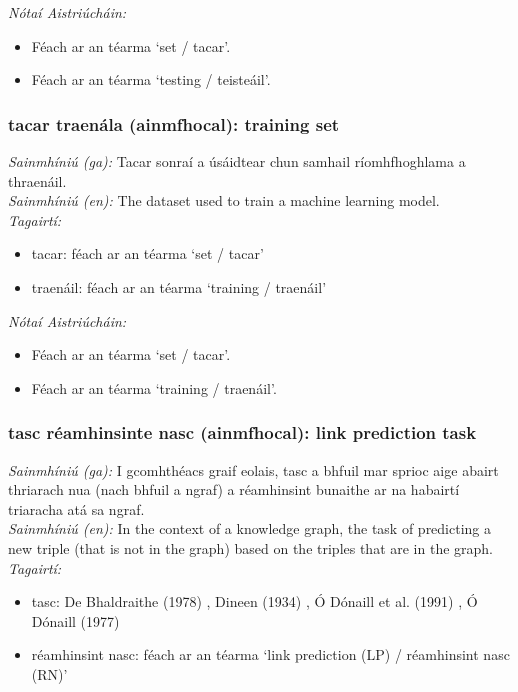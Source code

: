 \documentclass{article}
\begin{document}
 \noindent \textit{Nótaí Aistriúcháin:}
\begin{itemize}
	\item Féach ar an téarma `set / tacar'.
	\item Féach ar an téarma `testing / teisteáil'.
\end{itemize}


\subsubsection*{tacar traenála (ainmfhocal): training set}
 \noindent \textit{Sainmhíniú (ga):} Tacar sonraí a úsáidtear chun samhail ríomhfhoghlama a thraenáil.
\\
 \noindent \textit{Sainmhíniú (en):} The dataset used to train a machine learning model.
\\
 \noindent \textit{Tagairtí:}
\begin{itemize}
	\item tacar: féach ar an téarma `set / tacar'
	\item traenáil: féach ar an téarma `training / traenáil'
\end{itemize}

 \noindent \textit{Nótaí Aistriúcháin:}
\begin{itemize}
	\item Féach ar an téarma `set / tacar'.
	\item Féach ar an téarma `training / traenáil'.
\end{itemize}


\subsubsection*{tasc réamhinsinte nasc (ainmfhocal): link prediction task}
 \noindent \textit{Sainmhíniú (ga):} I gcomhthéacs graif eolais, tasc a bhfuil mar sprioc aige abairt thriarach nua (nach bhfuil a ngraf) a réamhinsint bunaithe ar na habairtí triaracha atá sa ngraf.
\\
 \noindent \textit{Sainmhíniú (en):} In the context of a knowledge graph, the task of predicting a new triple (that is not in the graph) based on the triples that are in the graph.
\\
 \noindent \textit{Tagairtí:}
\begin{itemize}
	\item tasc: De Bhaldraithe (1978) \cite{de-bhaldraithe}, Dineen (1934) \cite{dineen}, Ó Dónaill et al. (1991) \cite{focloir-beag}, Ó Dónaill (1977) \cite{odonaill}
	\item réamhinsint nasc: féach ar an téarma `link prediction (LP) / réamhinsint nasc (RN)'
\end{itemize}
\end{document}
